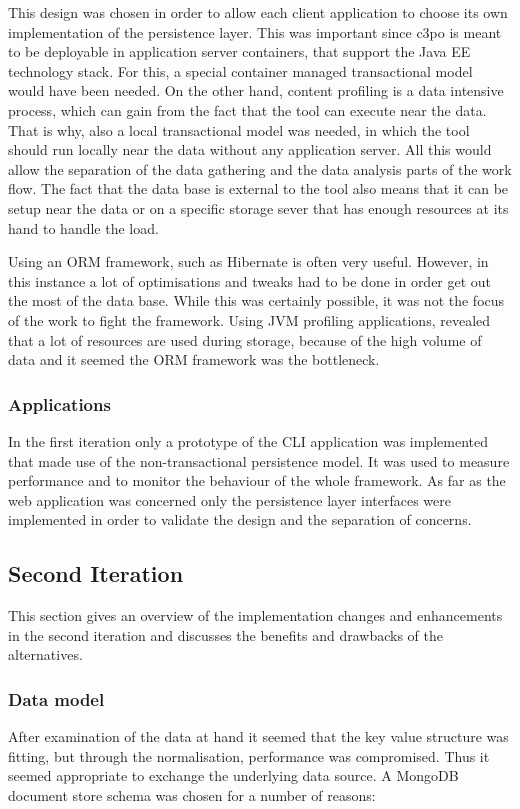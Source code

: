 This design was chosen in order to allow each client application to choose its own implementation of the persistence layer. This was important since c3po is meant to be deployable in application server containers, that support the Java EE technology stack. For this, a special container managed transactional model would have been needed. On the other hand, content profiling is a data intensive process, which can gain from the fact that the tool can execute near the data. That is why, also a local transactional model was needed, in which the tool should run locally near the data without any application server. All this would allow the separation of the data gathering and the data analysis parts of the work flow. The fact that the data base is external to the tool also means that it can be setup near the data or on a specific storage sever that has enough resources at its hand to handle the load.

Using an ORM framework, such as Hibernate is often very useful. However, in this instance a lot of optimisations and tweaks had to be done in order get out the most of the data base. While this was certainly possible, it was not the focus of the work to fight the framework. Using JVM profiling applications, revealed that a lot of resources are used during storage, because of the high volume of data and it seemed the ORM framework was the bottleneck.

\subsubsection{Applications}
In the first iteration only a prototype of the CLI application was implemented that made use of the non-transactional persistence model. It was used to measure performance and to monitor the behaviour of the whole framework. As far as the web application was concerned only the persistence layer interfaces were implemented in order to validate the design and the separation of concerns.

\subsection{Second Iteration}
This section gives an overview of the implementation changes and enhancements in the second iteration and discusses the benefits and drawbacks of the alternatives.

\subsubsection{Data model}
After examination of the data at hand it seemed that the key value structure was fitting, but through the normalisation, performance was compromised. Thus it seemed appropriate to exchange the underlying data source. A MongoDB document store schema was chosen for a number of reasons:


